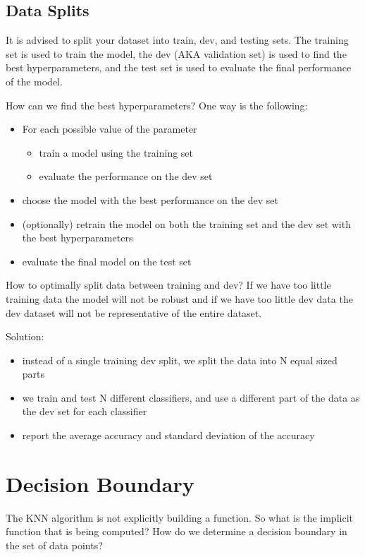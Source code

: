 \subsection{Data Splits}
It is advised to split your dataset into train, dev, and testing sets. The training set is used to train the model, the dev (AKA validation set) is used to find the best hyperparameters, and the test set is used to evaluate the final performance of the model. 

How can we find the best hyperparameters? One way is the following:
\begin{itemize}
    \item For each possible value of the parameter
    \begin{itemize}
        \item train a model using the training set
        \item evaluate the performance on the dev set
    \end{itemize}
    \item choose the model with the best performance on the dev set
    \item (optionally) retrain the model on both the training set and the dev set with the best hyperparameters
    \item evaluate the final model on the test set
\end{itemize}

How to optimally split data between training and dev? If we have too little training data the model will not be robust and if we have too little dev data the dev dataset will not be representative of the entire dataset.

Solution: 
\begin{itemize}
    \item instead of a single training dev split, we split the data into N equal sized parts
    \item we train and test N different classifiers, and use a different part of the data as the dev set for each classifier
    \item report the average accuracy and standard deviation of the accuracy
\end{itemize}

\section{Decision Boundary}
The KNN algorithm is not explicitly building a function. So what is the implicit function that is being computed? How do we determine a decision boundary in the set of data points?

